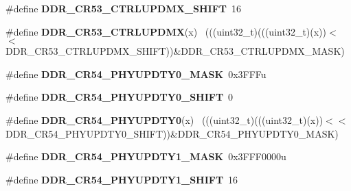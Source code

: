 \begin{DoxyCompactItemize}
\item 
\hypertarget{group___d_d_r___register___masks_gadc18f40fcd5f15ddf00ded1920b4573b}{}\#define {\bfseries D\+D\+R\+\_\+\+C\+R53\+\_\+\+C\+T\+R\+L\+U\+P\+D\+M\+X\+\_\+\+S\+H\+I\+F\+T}~16\label{group___d_d_r___register___masks_gadc18f40fcd5f15ddf00ded1920b4573b}

\item 
\hypertarget{group___d_d_r___register___masks_gabe403eed7d8280b9eb70ecb767a3c3a2}{}\#define {\bfseries D\+D\+R\+\_\+\+C\+R53\+\_\+\+C\+T\+R\+L\+U\+P\+D\+M\+X}(x)                                    ~(((uint32\+\_\+t)(((uint32\+\_\+t)(x))$<$$<$D\+D\+R\+\_\+\+C\+R53\+\_\+\+C\+T\+R\+L\+U\+P\+D\+M\+X\+\_\+\+S\+H\+I\+F\+T))\&D\+D\+R\+\_\+\+C\+R53\+\_\+\+C\+T\+R\+L\+U\+P\+D\+M\+X\+\_\+\+M\+A\+S\+K)\label{group___d_d_r___register___masks_gabe403eed7d8280b9eb70ecb767a3c3a2}

\item 
\hypertarget{group___d_d_r___register___masks_ga79bffb329f00cac5fa21918a1c5007b3}{}\#define {\bfseries D\+D\+R\+\_\+\+C\+R54\+\_\+\+P\+H\+Y\+U\+P\+D\+T\+Y0\+\_\+\+M\+A\+S\+K}~0x3\+F\+F\+Fu\label{group___d_d_r___register___masks_ga79bffb329f00cac5fa21918a1c5007b3}

\item 
\hypertarget{group___d_d_r___register___masks_ga2d2bb9aeee00ee7a08118ffa451933f2}{}\#define {\bfseries D\+D\+R\+\_\+\+C\+R54\+\_\+\+P\+H\+Y\+U\+P\+D\+T\+Y0\+\_\+\+S\+H\+I\+F\+T}~0\label{group___d_d_r___register___masks_ga2d2bb9aeee00ee7a08118ffa451933f2}

\item 
\hypertarget{group___d_d_r___register___masks_ga14cc1e1bee92cda792f89c6fb3c78f91}{}\#define {\bfseries D\+D\+R\+\_\+\+C\+R54\+\_\+\+P\+H\+Y\+U\+P\+D\+T\+Y0}(x)                                    ~(((uint32\+\_\+t)(((uint32\+\_\+t)(x))$<$$<$D\+D\+R\+\_\+\+C\+R54\+\_\+\+P\+H\+Y\+U\+P\+D\+T\+Y0\+\_\+\+S\+H\+I\+F\+T))\&D\+D\+R\+\_\+\+C\+R54\+\_\+\+P\+H\+Y\+U\+P\+D\+T\+Y0\+\_\+\+M\+A\+S\+K)\label{group___d_d_r___register___masks_ga14cc1e1bee92cda792f89c6fb3c78f91}

\item 
\hypertarget{group___d_d_r___register___masks_ga220f3a61f7a2d68a99ae90b0ecae0eb4}{}\#define {\bfseries D\+D\+R\+\_\+\+C\+R54\+\_\+\+P\+H\+Y\+U\+P\+D\+T\+Y1\+\_\+\+M\+A\+S\+K}~0x3\+F\+F\+F0000u\label{group___d_d_r___register___masks_ga220f3a61f7a2d68a99ae90b0ecae0eb4}

\item 
\hypertarget{group___d_d_r___register___masks_gad46e1d193480285e1e131f940ffcfb45}{}\#define {\bfseries D\+D\+R\+\_\+\+C\+R54\+\_\+\+P\+H\+Y\+U\+P\+D\+T\+Y1\+\_\+\+S\+H\+I\+F\+T}~16\label{group___d_d_r___register___masks_gad46e1d193480285e1e131f940ffcfb45}


\end{DoxyCompactItemize}
